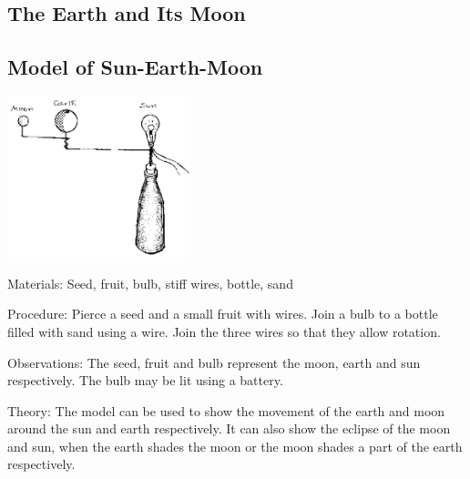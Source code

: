 \begin{multicols}{2}

\section*{The Earth and Its Moon}


\subsection{Model of Sun-Earth-Moon}

\begin{center}
\includegraphics[width=0.4\textwidth]{./img/source/sun-earth-moon.png}
\end{center}

\begin{description*}
\item[Materials:]{Seed, fruit, bulb, stiff wires, bottle, sand}
\item[Procedure:]{Pierce a seed and a small fruit with wires. Join a bulb to a bottle filled with sand using a wire. Join the three wires so that they allow rotation.}
\item[Observations:]{The seed, fruit and bulb represent the moon, earth and sun respectively. The bulb may be lit using a battery.}
\item[Theory:]{The model can be used to show the movement of the earth and moon around the sun and earth respectively. It can also show the eclipse of the moon and sun, when the earth shades the moon or the moon shades a part of the earth respectively.}
\end{description*}




\end{multicols}

\pagebreak